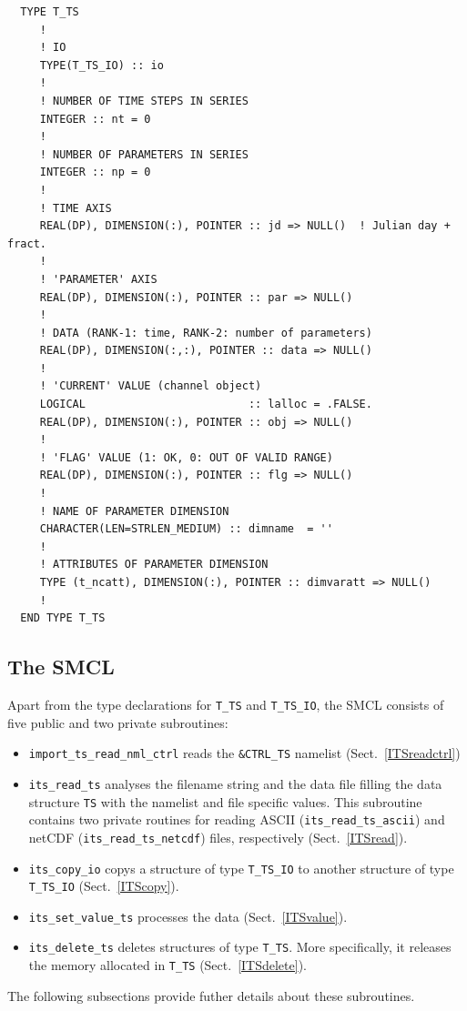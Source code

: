 \documentclass[11pt,twoside]{report}
\begin{document}
\begin{verbatim}
  TYPE T_TS
     !
     ! IO
     TYPE(T_TS_IO) :: io
     !
     ! NUMBER OF TIME STEPS IN SERIES
     INTEGER :: nt = 0
     !
     ! NUMBER OF PARAMETERS IN SERIES
     INTEGER :: np = 0
     !
     ! TIME AXIS
     REAL(DP), DIMENSION(:), POINTER :: jd => NULL()  ! Julian day + fract.
     !
     ! 'PARAMETER' AXIS
     REAL(DP), DIMENSION(:), POINTER :: par => NULL()
     !
     ! DATA (RANK-1: time, RANK-2: number of parameters)
     REAL(DP), DIMENSION(:,:), POINTER :: data => NULL()
     !
     ! 'CURRENT' VALUE (channel object)
     LOGICAL                         :: lalloc = .FALSE.
     REAL(DP), DIMENSION(:), POINTER :: obj => NULL()
     !
     ! 'FLAG' VALUE (1: OK, 0: OUT OF VALID RANGE)
     REAL(DP), DIMENSION(:), POINTER :: flg => NULL()
     !
     ! NAME OF PARAMETER DIMENSION
     CHARACTER(LEN=STRLEN_MEDIUM) :: dimname  = ''
     !
     ! ATTRIBUTES OF PARAMETER DIMENSION
     TYPE (t_ncatt), DIMENSION(:), POINTER :: dimvaratt => NULL() 
     !
  END TYPE T_TS
\end{verbatim}

\subsection{The SMCL}
Apart from the type declarations for \verb|T_TS| and \verb|T_TS_IO|, 
the SMCL consists of five public and two private subroutines:
\begin{itemize}
\item \verb|import_ts_read_nml_ctrl| reads the \verb|&CTRL_TS| namelist
(Sect.~\ref{ITSreadctrl})
\item \verb|its_read_ts| analyses the filename string and the data
file filling the data structure \verb|TS| with the 
namelist and file specific values. This subroutine contains two private
routines for reading ASCII (\verb|its_read_ts_ascii|) and netCDF
(\verb|its_read_ts_netcdf|) files, respectively (Sect.~\ref{ITSread}). 
\item \verb|its_copy_io| copys a structure of type \verb|T_TS_IO| to another
structure of type \verb|T_TS_IO| (Sect.~\ref{ITScopy}).
\item \verb|its_set_value_ts| processes the data (Sect.~\ref{ITSvalue}).
\item \verb|its_delete_ts| deletes structures of type \verb|T_TS|. More
specifically, it releases the memory allocated in \verb|T_TS| (Sect.~\ref{ITSdelete}).
\end{itemize}
The following subsections provide futher details about these subroutines.
\end{document}
